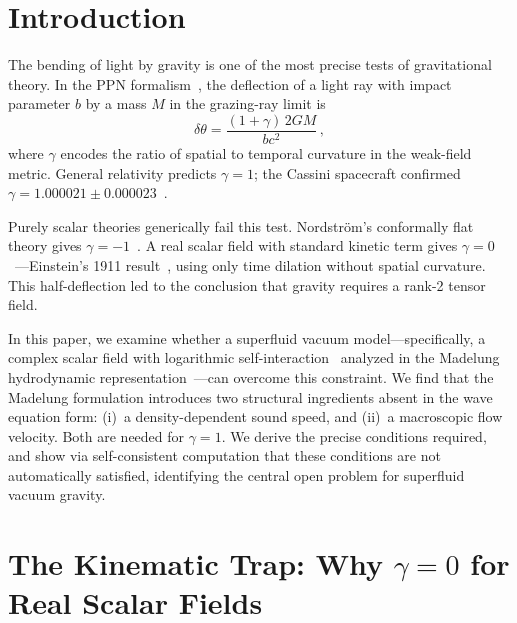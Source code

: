 \documentclass[12pt, a4paper]{article}
\begin{document}
\section{Introduction}
\label{sec:intro}

The bending of light by gravity is one of the most precise tests of gravitational theory. In the PPN formalism~\cite[Eq.~(28)]{will_2014}, the deflection of a light ray with impact parameter $b$ by a mass $M$ in the grazing-ray limit is
\begin{equation}
    \delta\theta = \frac{(1+\gamma)\,2GM}{bc^2}\,,
\label{eq:deflection}
\end{equation}
where $\gamma$ encodes the ratio of spatial to temporal curvature in the weak-field metric. General relativity predicts $\gamma = 1$; the Cassini spacecraft confirmed $\gamma = 1.000021 \pm 0.000023$~\cite{bertotti_2003}.

Purely scalar theories generically fail this test. Nordstr\"{o}m's conformally flat theory gives $\gamma = -1$~\cite{nordstrom_1913}. A real scalar field with standard kinetic term gives $\gamma = 0$~\cite{will_2014}---Einstein's 1911 result~\cite{einstein_1911}, using only time dilation without spatial curvature. This half-deflection led to the conclusion that gravity requires a rank-2 tensor field.

In this paper, we examine whether a superfluid vacuum model---specifically, a complex scalar field with logarithmic self-interaction~\cite{rosen_1969,bialynicki_birula_1979,bartkowski_gorka_2008} analyzed in the Madelung hydrodynamic representation~\cite{madelung_1927,bohm_1952,holland_1993}---can overcome this constraint. We find that the Madelung formulation introduces two structural ingredients absent in the wave equation form: (i)~a density-dependent sound speed, and (ii)~a macroscopic flow velocity. Both are needed for $\gamma = 1$. We derive the precise conditions required, and show via self-consistent computation that these conditions are not automatically satisfied, identifying the central open problem for superfluid vacuum gravity.


\section{The Kinematic Trap: Why \texorpdfstring{$\gamma = 0$}{gamma = 0} for Real Scalar Fields}
\label{sec:kinematic_trap}
\end{document}

